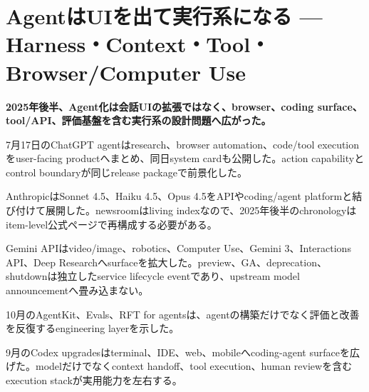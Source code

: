\section{AgentはUIを出て実行系になる — Harness・Context・Tool・Browser/Computer Use}
\label{pkg:agent}
\noindent\textbf{2025年後半、Agent化は会話UIの拡張ではなく、browser、coding surface、tool/API、評価基盤を含む実行系の設計問題へ広がった。}\autocite{src-7a7213b68631,src-b074ccdb2d9e}

7月17日のChatGPT agentはresearch、browser automation、code/tool executionをuser-facing productへまとめ、同日system cardも公開した。action capabilityとcontrol boundaryが同じrelease packageで前景化した。\autocite{src-7a7213b68631,src-b074ccdb2d9e}


AnthropicはSonnet 4.5、Haiku 4.5、Opus 4.5をAPIやcoding/agent platformと結び付けて展開した。newsroomはliving indexなので、2025年後半のchronologyはitem-level公式ページで再構成する必要がある。\autocite{src-f6aa679babd7}


Gemini APIはvideo/image、robotics、Computer Use、Gemini 3、Interactions API、Deep Researchへsurfaceを拡大した。preview、GA、deprecation、shutdownは独立したservice lifecycle eventであり、upstream model announcementへ畳み込まない。\autocite{src-a24fd97eb3d0}


10月のAgentKit、Evals、RFT for agentsは、agentの構築だけでなく評価と改善を反復するengineering layerを示した。\autocite{src-0661418088b8}


9月のCodex upgradesはterminal、IDE、web、mobileへcoding-agent surfaceを広げた。modelだけでなくcontext handoff、tool execution、human reviewを含むexecution stackが実用能力を左右する。\autocite{src-6deeebce1719}
